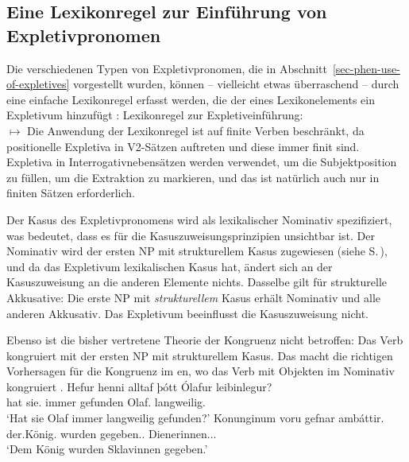 \subsection{Eine Lexikonregel zur Einführung von Expletivpronomen}
\label{sec-analysis-expletives}

Die verschiedenen Typen von Expletivpronomen, die in Abschnitt~\ref{sec-phen-use-of-expletives} vorgestellt wurden, können -- vielleicht etwas überraschend -- durch
eine einfache Lexikonregel erfasst werden, die der \argstl eines Lexikonelements ein Expletivum hinzufügt
\citep[]{MOe2011a}:
\ea
\label{positional-expl-lr}
Lexikonregel zur Expletiveinführung:\\
 $\mapsto$
\z
Die Anwendung der Lexikonregel ist auf finite Verben beschränkt, da positionelle Expletiva in
V2-Sätzen auftreten und diese immer finit sind. Expletiva in Interrogativnebensätzen werden verwendet, um
die Subjektposition zu füllen, um die Extraktion zu markieren, und das ist natürlich auch nur in finiten
Sätzen erforderlich.

Der Kasus des Expletivpronomens wird als lexikalischer Nominativ spezifiziert, was bedeutet, dass es
für die Kasuszuweisungsprinzipien unsichtbar ist. Der Nominativ wird der ersten NP mit strukturellem Kasus zugewiesen
(siehe S.\,\pageref{case-p}), und da das Expletivum lexikalischen Kasus hat, ändert sich an der
Kasuszuweisung an die anderen Elemente nichts. Dasselbe gilt
für strukturelle Akkusative: Die erste NP mit \emph{strukturellem} Kasus erhält Nominativ und alle anderen
Akkusativ. Das Expletivum beeinflusst die Kasuszuweisung nicht.

Ebenso ist die bisher vertretene Theorie der Kongruenz nicht betroffen: Das Verb kongruiert mit der
ersten NP mit strukturellem Kasus. Das macht die richtigen Vorhersagen für die Kongruenz im en, wo
das Verb mit Objekten im Nominativ kongruiert \citep[]{ZMT85a}.
\eal
\ex
\gll Hefur henni      alltaf þótt    Ólafur      leibinlegur?\footnotemark\\
     hat sie.\DAT{} immer gefunden Olaf.\NOM{} langweilig.\NOM{}\\\icelandic
{}
\glt `Hat sie Olaf immer langweilig gefunden?'
\ex
\label{ex-dat-subj-passive-ditransitive-icelandic-two}
\gll Konunginum voru gefnar ambáttir.\footnotemark\\
     der.König.\DAT{} wurden gegeben.\F.\PL{} Dienerinnen.\NOM.\F.\PL\\
\glt `Dem König wurden Sklavinnen gegeben.'
\zl

